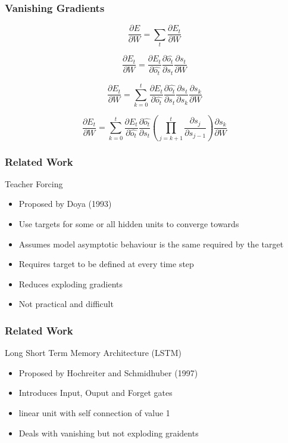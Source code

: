 \documentclass{beamer}
\begin{document}
\begin{frame}
	\frametitle{Vanishing Gradients}
	
	\[
		\frac{\partial E}{\partial W} = 
			\sum_{t} \frac{\partial E_{t}}{\partial W}
	\]
	
	\[
		\frac{\partial E_{t}}{\partial W} =
			\frac{\partial E_{t}}{\partial \hat{o_{t}}}
			\frac{\partial \hat{o_{t}}}{\partial s_{t}}
			\frac{\partial s_{t}}{\partial W}
	\]
	
	\[
		\frac{\partial E_{t}}{\partial W} =
			\sum_{k = 0}^{t} 
				\frac{\partial E_{t}}{\partial \hat{o_{t}}}
				\frac{\partial \hat{o_{t}}}{\partial s_{t}}
				\frac{\partial s_{t}}{\partial s_{k}}
				\frac{\partial s_{k}}{\partial W}
	\]
	
	\[
		\frac{\partial E_{t}}{\partial W} =
			\sum_{k = 0}^{t} 
				\frac{\partial E_{t}}{\partial \hat{o_{t}}}
				\frac{\partial \hat{o_{t}}}{\partial s_{t}}
				\left(
					\prod_{j = k + 1}^{t}
						\frac{\partial s_{j}}{\partial s_{j - 1}}
				\right)
				\frac{\partial s_{k}}{\partial W}
	\]
	
\end{frame}



\begin{frame}
	\frametitle{Related Work}
	\begin{block}{Teacher Forcing}
		\begin{itemize}
			\item{Proposed by Doya (1993)}
			\item{Use targets for some or all hidden units to converge towards}
			\item{Assumes model asymptotic behaviour is the same required by the target}
			\item{Requires target to be defined at every time step}
			\item{Reduces exploding gradients}
			\item{Not practical and difficult}
		\end{itemize}
	\end{block}
\end{frame}


\begin{frame}
	\frametitle{Related Work}
	
	\begin{block}{Long Short Term Memory Architecture (LSTM)}
		\begin{itemize}
			\item{Proposed by Hochreiter and Schmidhuber (1997)}
			\item{Introduces Input, Ouput and Forget gates}
			\item{linear unit with self connection of value 1}
			\item{Deals with vanishing but not exploding graidents}
		\end{itemize}
	\end{block}
\end{frame}
\end{document}
